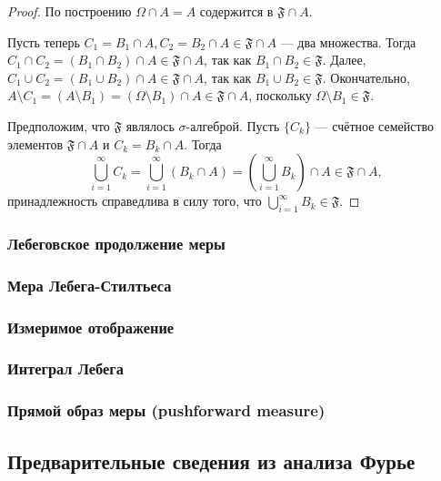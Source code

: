 \documentclass[12pt]{article}
\numberwithin{theorem}{section}
\numberwithin{proposition}{section}
\theoremstyle{definition}
\newcommand{\events}{\mathfrak{F}}
\begin{document}
	\begin{proof}
		По построению $ \Omega \cap A = A $ содержится в $ \events \cap A $.
		
		Пусть теперь $ C_1 = B_1 \cap A, C_2 = B_2 \cap A \in \events \cap A $ --- два множества.
		Тогда $ C_1 \cap C_2 = (B_1 \cap B_2)  \cap A \in \events \cap A $, так как $ B_1 \cap B_2 \in \events $.
		Далее, $ C_1 \cup C_2 = (B_1 \cup B_2) \cap A \in \events \cap A $, так как $ B_1 \cup B_2 \in \events $.
		Окончательно, $ A \setminus C_1 = (A \setminus B_1) = (\Omega \setminus B_1) \cap A \in \events \cap A $,
		поскольку $ \Omega \setminus B_1 \in \events $.
		
		Предположим, что $ \events $ являлось $ \sigma $-алгеброй. Пусть $ \{C_k\} $ --- счётное семейство 
		элементов $ \events \cap A $ и $ C_k = B_k \cap A $.
		Тогда
		$$ \bigcup\limits_{i = 1}^{\infty} C_k = \bigcup\limits_{i = 1}^{\infty} (B_k \cap A) 
		= \left(\bigcup\limits_{i = 1}^{\infty} B_k \right) \cap A \in \events \cap A, $$
		принадлежность справедлива в силу того, что $ \bigcup\limits_{i = 1}^{\infty} B_k \in \events $.
	\end{proof}
	
	\subsubsection{Лебеговское продолжение меры}
	
	\subsubsection{Мера Лебега-Стилтьеса}
	
	\subsubsection{Измеримое отображение}
	
	\subsubsection{Интеграл Лебега}
	
	\subsubsection{Прямой образ меры (pushforward measure)}
	
	\subsection{Предварительные сведения из анализа Фурье}
	
\end{document}
